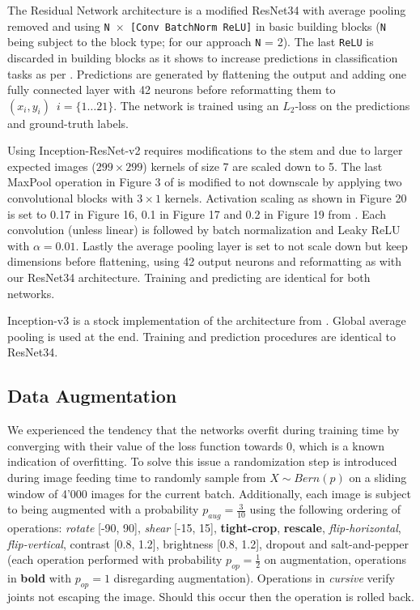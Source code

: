 The Residual Network architecture is a modified ResNet34 with average pooling removed and using \texttt{N $\times$ [Conv BatchNorm ReLU]} in basic building blocks (\texttt{N} being subject to the block type; for our approach \texttt{N} = 2). The last \texttt{ReLU} is discarded in building blocks as it shows to increase predictions in classification tasks as per \cite{url:torch7_resnet}. Predictions are generated by flattening the output and adding one fully connected layer with 42 neurons before reformatting them to $\left(x_i, y_i\right)\enspace i=\{1\dots 21\}$. The network is trained using an $L_2$-loss on the predictions and ground-truth labels.

Using Inception-ResNet-v2 requires modifications to the stem and due to larger expected images ($299 \times 299$) kernels of size 7 are scaled down to 5. The last MaxPool operation in Figure 3 of \cite{DBLP:journals/corr/SzegedyIV16} is modified to not downscale by applying two convolutional blocks with $3 \times 1$ kernels. Activation scaling as shown in Figure 20 is set to 0.17 in Figure 16, 0.1 in Figure 17 and 0.2 in Figure 19 from \cite{url:tensorflow_incresnetv2}. Each convolution (unless linear) is followed by batch normalization and Leaky ReLU with $\alpha = 0.01$. Lastly the average pooling layer is set to not scale down but keep dimensions before flattening, using 42 output neurons and reformatting as with our ResNet34 architecture. Training and predicting are identical for both networks.

Inception-v3 is a stock implementation of the architecture from \cite{DBLP:journals/corr/SzegedyVISW15}. Global average pooling is used at the end. Training and prediction procedures are identical to ResNet34. 

\subsection{Data Augmentation}
We experienced the tendency that the networks overfit during training time by converging with their value of the loss function towards 0, which is a known indication of overfitting. To solve this issue a randomization step is introduced during image feeding time to randomly sample from $X \sim Bern(p)$ on a sliding window of 4'000 images for the current batch. Additionally, each image is subject to being augmented with a probability $p_{aug} = \tfrac{3}{10}$ using the following ordering of operations: \emph{rotate} [-90\textdegree, 90\textdegree], \emph{shear} [-15\textdegree, 15\textdegree], \textbf{tight-crop}, \textbf{rescale}, \emph{flip-horizontal}, \emph{flip-vertical}, contrast [0.8, 1.2], brightness [0.8, 1.2], dropout and salt-and-pepper (each operation performed with probability $p_{op} = \tfrac{1}{2}$ on augmentation, operations in \textbf{bold} with $p_{op} = 1$ disregarding augmentation). Operations in \emph{cursive} verify joints not escaping the image. Should this occur then the operation is rolled back.


